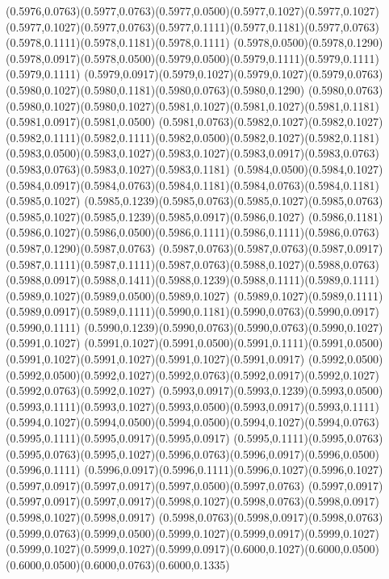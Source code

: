 (0.5976,0.0763)(0.5977,0.0763)(0.5977,0.0500)(0.5977,0.1027)(0.5977,0.1027)
\PST@Solid(0.5977,0.1027)(0.5977,0.0763)(0.5977,0.1111)(0.5977,0.1181)(0.5977,0.0763)(0.5978,0.1111)(0.5978,0.1181)(0.5978,0.1111)
(0.5978,0.0500)(0.5978,0.1290)(0.5978,0.0917)(0.5978,0.0500)(0.5979,0.0500)(0.5979,0.1111)(0.5979,0.1111)(0.5979,0.1111)
(0.5979,0.0917)(0.5979,0.1027)(0.5979,0.1027)(0.5979,0.0763)(0.5980,0.1027)(0.5980,0.1181)(0.5980,0.0763)(0.5980,0.1290)
(0.5980,0.0763)(0.5980,0.1027)(0.5980,0.1027)(0.5981,0.1027)(0.5981,0.1027)(0.5981,0.1181)(0.5981,0.0917)(0.5981,0.0500)
(0.5981,0.0763)(0.5982,0.1027)(0.5982,0.1027)(0.5982,0.1111)(0.5982,0.1111)(0.5982,0.0500)(0.5982,0.1027)(0.5982,0.1181)
(0.5983,0.0500)(0.5983,0.1027)(0.5983,0.1027)(0.5983,0.0917)(0.5983,0.0763)(0.5983,0.0763)(0.5983,0.1027)(0.5983,0.1181)
(0.5984,0.0500)(0.5984,0.1027)(0.5984,0.0917)(0.5984,0.0763)(0.5984,0.1181)(0.5984,0.0763)(0.5984,0.1181)(0.5985,0.1027)
(0.5985,0.1239)(0.5985,0.0763)(0.5985,0.1027)(0.5985,0.0763)(0.5985,0.1027)(0.5985,0.1239)(0.5985,0.0917)(0.5986,0.1027)
(0.5986,0.1181)(0.5986,0.1027)(0.5986,0.0500)(0.5986,0.1111)(0.5986,0.1111)(0.5986,0.0763)(0.5987,0.1290)(0.5987,0.0763)
(0.5987,0.0763)(0.5987,0.0763)(0.5987,0.0917)(0.5987,0.1111)(0.5987,0.1111)(0.5987,0.0763)(0.5988,0.1027)(0.5988,0.0763)
(0.5988,0.0917)(0.5988,0.1411)(0.5988,0.1239)(0.5988,0.1111)(0.5989,0.1111)(0.5989,0.1027)(0.5989,0.0500)(0.5989,0.1027)
(0.5989,0.1027)(0.5989,0.1111)(0.5989,0.0917)(0.5989,0.1111)(0.5990,0.1181)(0.5990,0.0763)(0.5990,0.0917)(0.5990,0.1111)
(0.5990,0.1239)(0.5990,0.0763)(0.5990,0.0763)(0.5990,0.1027)(0.5991,0.1027)
\PST@Solid(0.5991,0.1027)(0.5991,0.0500)(0.5991,0.1111)(0.5991,0.0500)(0.5991,0.1027)(0.5991,0.1027)(0.5991,0.1027)(0.5991,0.0917)
(0.5992,0.0500)(0.5992,0.0500)(0.5992,0.1027)(0.5992,0.0763)(0.5992,0.0917)(0.5992,0.1027)(0.5992,0.0763)(0.5992,0.1027)
(0.5993,0.0917)(0.5993,0.1239)(0.5993,0.0500)(0.5993,0.1111)(0.5993,0.1027)(0.5993,0.0500)(0.5993,0.0917)(0.5993,0.1111)
(0.5994,0.1027)(0.5994,0.0500)(0.5994,0.0500)(0.5994,0.1027)(0.5994,0.0763)(0.5995,0.1111)(0.5995,0.0917)(0.5995,0.0917)
(0.5995,0.1111)(0.5995,0.0763)(0.5995,0.0763)(0.5995,0.1027)(0.5996,0.0763)(0.5996,0.0917)(0.5996,0.0500)(0.5996,0.1111)
(0.5996,0.0917)(0.5996,0.1111)(0.5996,0.1027)(0.5996,0.1027)(0.5997,0.0917)(0.5997,0.0917)(0.5997,0.0500)(0.5997,0.0763)
(0.5997,0.0917)(0.5997,0.0917)(0.5997,0.0917)(0.5998,0.1027)(0.5998,0.0763)(0.5998,0.0917)(0.5998,0.1027)(0.5998,0.0917)
(0.5998,0.0763)(0.5998,0.0917)(0.5998,0.0763)(0.5999,0.0763)(0.5999,0.0500)(0.5999,0.1027)(0.5999,0.0917)(0.5999,0.1027)
(0.5999,0.1027)(0.5999,0.1027)(0.5999,0.0917)(0.6000,0.1027)(0.6000,0.0500)(0.6000,0.0500)(0.6000,0.0763)(0.6000,0.1335)
